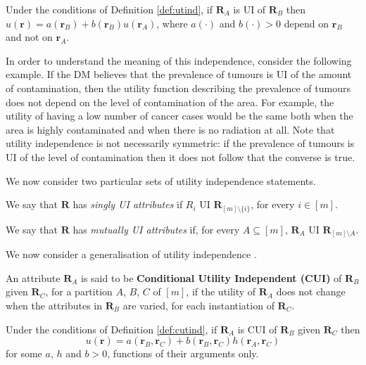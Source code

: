 \begin{proposition}
Under the conditions of Definition \ref{def:utind}, if $\bm{R}_A$ is UI of $\bm{R}_B$ then $ u(\bm{r})=a(\bm{r}_B)+b(\bm{r}_B)u(\bm{r}_A)$, where $a(\cdot)$ and $b(\cdot)>0$ depend on $\bm{r}_{B}$ and not on $\bm{r}_A$. 
\end{proposition}

In order to understand the meaning of this independence, consider the following example. If the DM believes that the prevalence of tumours is UI of the amount of contamination, then the utility function describing the prevalence of tumours does not depend on the level of contamination of the area. For example, the utility of having a low number of cancer cases would be the same both when the area is highly contaminated and when there is no radiation at all. Note that utility independence is not necessarily symmetric: if the prevalence of tumours is UI of the level of contamination then it does not follow that the converse is true.

We now consider two particular sets of utility independence statements.

\begin{definition}
We say that $\bm{R}$ has \emph{singly UI attributes} if  $R_i$ UI $\bm{R}_{[m]\setminus \{i\}}$, for every $i\in[m]$.
\end{definition}

\begin{definition}
We say that $\bm{R}$ has \emph{mutually UI attributes} if, for every $A\subseteq[m]$, $\bm{R}_A$ UI $\bm{R}_{[m]\setminus A}$.
\end{definition}

We now consider a generalisation of utility independence \citep[see e.g.][]{Abbas2010}.
\begin{definition}
\label{def:cutind}
An attribute $\bm{R}_A$ is said to be \textbf{Conditional Utility Independent (CUI)} of $\bm{R}_B$ given $\bm{R}_C$, for a partition $A$, $B$, $C$ of $[m]$, if the utility of $\bm{R}_A$ does not change when the attributes in $\bm{R}_B$ are varied, for each instantiation of $\bm{R}_C$.
\end{definition}


\begin{proposition}
Under the conditions of Definition \ref{def:cutind}, if $\bm{R}_A$ is CUI of $\bm{R}_B$ given $\bm{R}_C$ then
\begin{equation}
u(\bm{r})=a(\bm{r}_B,\bm{r}_C)+b(\bm{r}_B,\bm{r}_C)h(\bm{r}_A,\bm{r}_C)
\label{eq:cui}
\end{equation}
for some $a$, $h$ and $b>0$, functions of their arguments only. 
\end{proposition}

